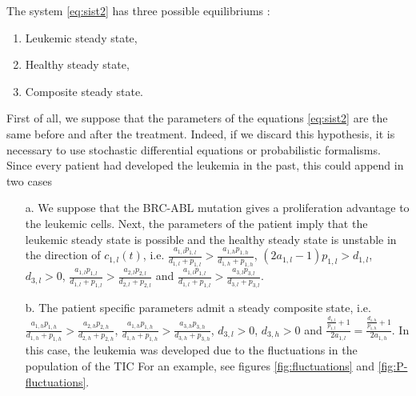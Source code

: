 \documentclass[a4paper,10pt]{article}
\begin{document}
The system \eqref{eq:sist2}
has three possible equilibriums \cite{stiehl2012mathematical}:
\begin{enumerate}
\item Leukemic steady state,
\item Healthy steady state,
\item Composite steady state.
\end{enumerate}
First of all, we suppose that the parameters of the equations \eqref{eq:sist2} 
are the same before 
and after the treatment. 
Indeed,  if we  discard this hypothesis, it is necessary
to use stochastic differential equations or 
probabilistic
formalisms.\\
Since every patient had developed the leukemia in the past, this could append in two cases 
\begin{enumerate}
\item [a.] We suppose that the BRC-ABL 
mutation gives a proliferation advantage to the leukemic cells. 
Next, the parameters of the patient imply that 
the leukemic steady state is possible and the
healthy steady state is unstable in the direction of $c_{1,l}(t)$, i.e. 
$\frac{a_{1,l}p_{1,l}}{d_{1,l}+p_{1,l}}>\frac{a_{1,h}p_{1,h}}{d_{1,h}+p_{1,h}}$,
$(2a_{1,l}-1)p_{1,l}>d_{1,l}$, $d_{3,l}>0$, 
$\frac{a_{1,l}p_{1,l}}{d_{1,l}+p_{1,l}}>\frac{a_{2,l}p_{2,l}}{d_{2,l}+p_{2,l}}$ and
$\frac{a_{1,l}p_{1,l}}{d_{1,l}+p_{1,l}}>\frac{a_{3,l}p_{3,l}}{d_{3,l}+p_{3,l}}$.


\item [b.] The patient specific parameters admit a steady composite state, i.e. 
$\frac{a_{1,h}p_{1,h}}{d_{1,h}+p_{1,h}}>\frac{a_{2,h}p_{2,h}}{d_{2,h}+p_{2,h}}$,
$\frac{a_{1,h}p_{1,h}}{d_{1,h}+p_{1,h}}>\frac{a_{3,h}p_{3,h}}{d_{3,h}+p_{3,h}}$,
$d_{3,l}>0$, $d_{3,h}>0$ and
$\frac{\frac{d_{1,l}}{p_{1,l}}+1}{2a_{1,l}}=\frac{\frac{d_{1,h}}{p_{1,h}}+1}{2a_{1,h}}$. 
In this case, the leukemia was developed due to the fluctuations in the population 
of the TIC \cite{stiehl2012mathematical} For an example, see figures \ref{fig:fluctuations} and 
\ref{fig:P-fluctuations}.
\end{enumerate}
\end{document}
